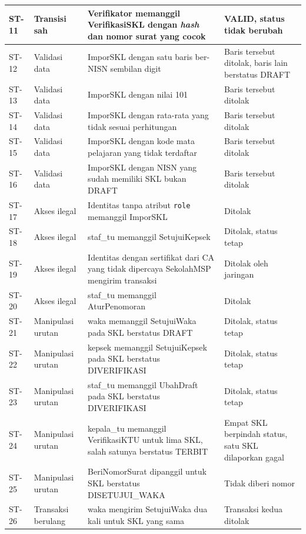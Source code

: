 \begin{longtable}{|>{\raggedright\arraybackslash}p{}|>{\raggedright\arraybackslash}p{}|>{\raggedright\arraybackslash}p{}|>{\raggedright\arraybackslash}p{}|}
    ST-11 & Transisi sah & Verifikator memanggil VerifikasiSKL dengan \textit{hash} dan nomor surat yang cocok & VALID, status tidak berubah \\ \hline
    ST-12 & Validasi data & ImporSKL dengan satu baris ber-NISN sembilan digit & Baris tersebut ditolak, baris lain berstatus DRAFT \\ \hline
    ST-13 & Validasi data & ImporSKL dengan nilai 101 & Baris tersebut ditolak \\ \hline
    ST-14 & Validasi data & ImporSKL dengan rata-rata yang tidak sesuai perhitungan & Baris tersebut ditolak \\ \hline
    ST-15 & Validasi data & ImporSKL dengan kode mata pelajaran yang tidak terdaftar & Baris tersebut ditolak \\ \hline
    ST-16 & Validasi data & ImporSKL dengan NISN yang sudah memiliki SKL bukan DRAFT & Baris tersebut ditolak \\ \hline
    ST-17 & Akses ilegal & Identitas tanpa atribut \texttt{role} memanggil ImporSKL & Ditolak \\ \hline
    ST-18 & Akses ilegal & staf\_tu memanggil SetujuiKepsek & Ditolak, status tetap \\ \hline
    ST-19 & Akses ilegal & Identitas dengan sertifikat dari CA yang tidak dipercaya SekolahMSP mengirim transaksi & Ditolak oleh jaringan \\ \hline
    ST-20 & Akses ilegal & staf\_tu memanggil AturPenomoran & Ditolak \\ \hline
    ST-21 & Manipulasi urutan & waka memanggil SetujuiWaka pada SKL berstatus DRAFT & Ditolak, status tetap \\ \hline
    ST-22 & Manipulasi urutan & kepsek memanggil SetujuiKepsek pada SKL berstatus DIVERIFIKASI & Ditolak, status tetap \\ \hline
    ST-23 & Manipulasi urutan & staf\_tu memanggil UbahDraft pada SKL berstatus DIVERIFIKASI & Ditolak, status tetap \\ \hline
    ST-24 & Manipulasi urutan & kepala\_tu memanggil VerifikasiKTU untuk lima SKL, salah satunya berstatus TERBIT & Empat SKL berpindah status, satu SKL dilaporkan gagal \\ \hline
    ST-25 & Manipulasi urutan & BeriNomorSurat dipanggil untuk SKL berstatus DISETUJUI\_\allowbreak WAKA & Tidak diberi nomor \\ \hline
    ST-26 & Transaksi berulang & waka mengirim SetujuiWaka dua kali untuk SKL yang sama & Transaksi kedua ditolak \\ \hline

\end{longtable}
